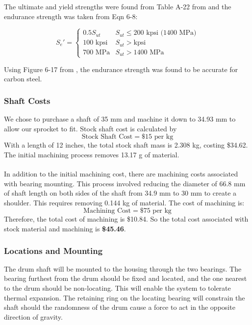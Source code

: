 \documentclass[letterpaper,12pt]{article}
\begin{document}
\noindent The ultimate and yield strengths were found from Table A-22 from \cite{shigley} and the endurance strength was taken from Eqn 6-8:

\begin{equation*}
    S_e' = 
    \begin{cases}
    0.5S_{ut} & S_{ut} \leq 200 \text{ kpsi (1400 MPa)}\\
    100 \text{ kpsi} & S_{ut} > \text{kpsi}\\
    700 \text{ MPa} & S_{ut} > 1400 \text{ MPa}
    \end{cases}
\end{equation*}

\noindent Using Figure 6-17 from \cite{shigley}, the endurance strength was found to be accurate for carbon steel.

\subsubsection{Shaft Costs}
We chose to purchase a shaft of 35 mm and machine it down to 34.93 mm to allow our sprocket to fit. Stock shaft cost is calculated by
\begin{equation*}
    \text{Stock Shaft Cost} = \$15 \text{ per kg}    
\end{equation*}
With a length of 12 inches, the total stock shaft mass is 2.308 kg, costing \$34.62. The initial machining process removes 13.17 g of material.
\\\\
In addition to the initial machining cost, there are machining costs associated with bearing mounting. This process involved reducing the diameter of 66.8 mm of shaft length on both sides of the shaft from 34.9 mm to 30 mm to create a shoulder. This requires removing 0.144 kg of material. The cost of machining is:
\begin{equation*}
    \text{Machining Cost} = \$75 \text{ per kg}   
\end{equation*}
Therefore, the total cost of machining is \$10.84. So the total cost associated with stock material and machining is \textbf{\$45.46}.

\subsubsection{Locations and Mounting}
The drum shaft will be mounted to the housing through the two bearings. The bearing furthest from the drum should be fixed and located, and the one nearest to the drum should be non-locating. This will enable the system to tolerate thermal expansion. The retaining ring on the locating bearing will constrain the shaft should the randomness of the drum cause a force to act in the opposite direction of gravity.
\end{document}

